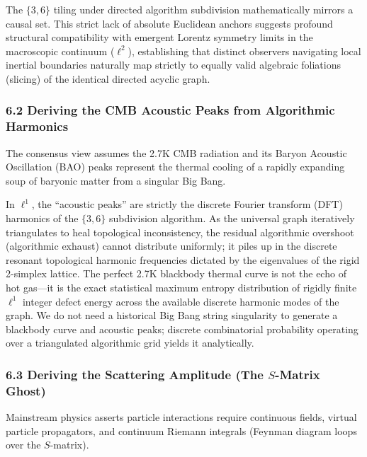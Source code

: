 \documentclass[
]{article}
\begin{document}
The \(\{3,6\}\) tiling under directed algorithm subdivision
mathematically mirrors a causal set. This strict lack of absolute
Euclidean anchors suggests profound structural compatibility with
emergent Lorentz symmetry limits in the macroscopic continuum
(\(\ell^2\)), establishing that distinct observers navigating local
inertial boundaries naturally map strictly to equally valid algebraic
foliations (slicing) of the identical directed acyclic graph.

\subsubsection{6.2 Deriving the CMB Acoustic Peaks from Algorithmic
Harmonics}\label{deriving-the-cmb-acoustic-peaks-from-algorithmic-harmonics}

The consensus view assumes the 2.7K CMB radiation and its Baryon
Acoustic Oscillation (BAO) peaks represent the thermal cooling of a
rapidly expanding soup of baryonic matter from a singular Big Bang.

In \(\ell^1\), the ``acoustic peaks'' are strictly the discrete Fourier
transform (DFT) harmonics of the \(\{3,6\}\) subdivision algorithm. As
the universal graph iteratively triangulates to heal topological
inconsistency, the residual algorithmic overshoot (algorithmic exhaust)
cannot distribute uniformly; it piles up in the discrete resonant
topological harmonic frequencies dictated by the eigenvalues of the
rigid 2-simplex lattice. The perfect 2.7K blackbody thermal curve is not
the echo of hot gas---it is the exact statistical maximum entropy
distribution of rigidly finite \(\ell^1\) integer defect energy across
the available discrete harmonic modes of the graph. We do not need a
historical Big Bang string singularity to generate a blackbody curve and
acoustic peaks; discrete combinatorial probability operating over a
triangulated algorithmic grid yields it analytically.

\subsubsection{\texorpdfstring{6.3 Deriving the Scattering Amplitude
(The \(S\)-Matrix
Ghost)}{6.3 Deriving the Scattering Amplitude (The S-Matrix Ghost)}}\label{deriving-the-scattering-amplitude-the-s-matrix-ghost}

Mainstream physics asserts particle interactions require continuous
fields, virtual particle propagators, and continuum Riemann integrals
(Feynman diagram loops over the \(S\)-matrix).
\end{document}
